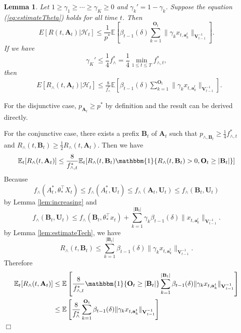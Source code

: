 \documentclass{article}
\newcommand{\EE}{\mathbb{E}}
\newcommand{\bOne}{\mathbbm{1}}
\newcommand{\bA}{\mathbf{A}}
\newcommand{\ba}{\mathbf{a}}
\newcommand{\bB}{\mathbf{B}}
\newcommand{\bO}{\mathbf{O}}
\newcommand{\bU}{\mathbf{U}}
\newcommand{\bV}{\mathbf{V}}
\newcommand{\cH}{\mathcal{H}}
\newcommand{\abs}[1]{\left| #1 \right|}
\newcommand{\norm}[1]{\| #1 \|}
\newtheorem{lemma}[theorem]{Lemma}%
\newenvironment{proof}{\noindent {\textbf{Proof. }}}{$\Box$ \medskip}
\newcommand{\wei}[1]{}
\newcommand{\wei}[1]{{\color{blue!50!black}  [\text{Wei:} #1]}}
\begin{document}
\wei{This lemma needs to be clarified, using Lemma 4.6.
Also, our regret bound is expected regret but with a high probability? Sound a 
bit strange.}
\begin{lemma}
Let $1 \geq \gamma_1 \geq \cdots \geq \gamma_K \geq 0$ and $\gamma_k' = 1 - \gamma_k$. Suppose the equation (\ref{eq:estimateTheta}) holds for all time $t$. Then
$$
E[R(t, \bA_t)|\cH_t] \leq \frac{1}{p^*} \EE\left[ \beta_{t-1}(\delta) \sum_{k=1}^{\bO_t}\norm{\gamma_k x_{t,\ba_k^t}}_{\bV_{t-1}^{-1}} \right].
$$
If we have
$$
\gamma_K' \le \frac{1}{4} f_{\wedge}^{\ast} = \frac{1}{4} \min_{1 \leq t \leq T} f_{\wedge, t}^{\ast},
$$
then
\begin{align*}
&E[R_{\wedge}(t, \bA_t)|\cH_t] \leq \frac{8}{f_{\wedge}^{\ast}} \EE\left[\beta_{t-1}(\delta)\sum_{k=1}^{\bO_t}\norm{\gamma_k x_{t,\ba_k^t}}_{\bV_{t-1}^{-1}}\right].
\end{align*}
\end{lemma}
\begin{proof}
For the disjunctive case,  $p_{\bA_t} \geq p^*$ by definition and the result can be derived directly.

For the conjunctive case, there exists a prefix $\bB_t$ of $\bA_t$ such that $p_{\wedge, \bB_t} \geq \frac{1}{4}f_{\wedge, t}^*$ and $R_{\wedge}(t, \bB_t) \geq \frac{1}{2} R_{\wedge}(t, \bA_t)$. Then we have
$$
\EE_t[R_{\wedge}(t, \bA_t)] \leq \frac{8}{f_{\wedge, t}^*} \EE_t[R_{\wedge}(t, \bB_t) \bOne\{R_{\wedge}(t, \bB_t) > 0, \bO_t \geq \abs{\bB_t}\}]
$$
Because 
$$
f_{\wedge}(A_t^*, \theta_*^{\top}X_t) \leq f_{\wedge}(A_t^*,\bU_t) \leq f_{\wedge}(\bA_t,\bU_t) \leq f_{\wedge}(\bB_t,\bU_t)
$$
by Lemma \ref{lem:increasing} and
$$
f_{\wedge}(\bB_t,\bU_t) \leq f_{\wedge}(\bB_t, \theta_*^{\top}x_t) + \sum_{k=1}^{\abs{\bB_t}}\gamma_k\beta_{t-1}(\delta)\norm{x_{t,\ba_k^t}}_{\bV_{t-1}^{-1}}.
$$
by Lemma \ref{lem:estimateTech}, we have
$$
R_{\wedge}(t, \bB_t) \leq \sum_{k=1}^{\abs{\bB_t}}\beta_{t-1}(\delta)\norm{\gamma_k x_{t,\ba_k^t}}_{\bV_{t-1}^{-1}}.
$$
Therefore
\begin{align*}
\EE_t[R_{\wedge}(t, \bA_t)] &\leq \EE \left[\frac{8}{f_{\wedge, t}^*} \bOne\{ \bO_t \geq \abs{\bB_t} \}\sum_{k=1}^{\abs{\bB_t}}\beta_{t-1}(\delta)\norm{\gamma_k x_{t,\ba_k^t}}_{\bV_{t-1}^{-1}} \right]\\
&\leq \EE \left[ \frac{8}{f_{\wedge}^*} \sum_{k=1}^{ \bO_t } \beta_{t-1}(\delta) \norm{\gamma_k x_{t,\ba_k^t}}_{\bV_{t-1}^{-1}} \right]
\end{align*}
\end{proof}
	
\end{document}
